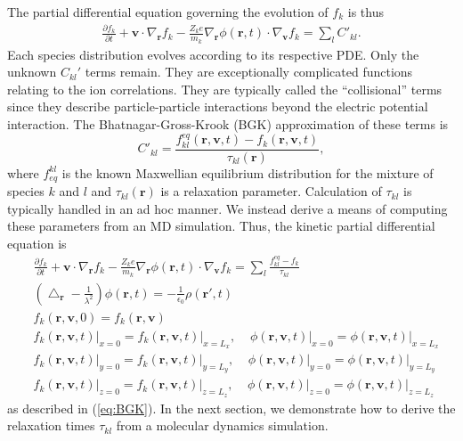 \documentclass{article}
\begin{document}
The partial differential equation governing the evolution of $f_k$ is thus
\begin{align*}
\frac{\partial f_k}{\partial t}+\mathbf{v}\cdot\nabla_\mathbf{r}f_k-\frac{Z_ke}{m_k}\nabla_\mathbf{r}\phi(\mathbf{r},t)\cdot\nabla_\mathbf{v}f_k=\sum_l C'_{kl}.
\end{align*}
Each species distribution evolves according to its respective PDE. Only the unknown $C_{kl}'$ terms remain. They are exceptionally complicated functions relating to the ion correlations. They are typically called the ``collisional'' terms since they describe particle-particle interactions beyond the electric potential interaction. The Bhatnagar-Gross-Krook (BGK) approximation of these terms is 
\[C'_{kl}=\frac{f_{kl}^{eq}(\mathbf{r},\mathbf{v},t)-f_k(\mathbf{r},\mathbf{v},t)}{\tau_{kl}(\mathbf{r})},
\]
where $f_{eq}^{kl}$ is the known Maxwellian equilibrium distribution for the mixture of species $k$ and $l$ and $\tau_{kl}(\mathbf{r})$ is a relaxation parameter. Calculation of $\tau_{kl}$ is  typically handled in an ad hoc manner. We instead derive a means of computing these parameters from an MD simulation. Thus, the kinetic partial differential equation is
\begin{equation*}
\begin{split}
&\frac{\partial f_k}{\partial t}+\mathbf{v}\cdot\nabla_\mathbf{r}f_k-\frac{Z_ke}{m_k}\nabla_\mathbf{r}\phi(\mathbf{r},t)\cdot\nabla_\mathbf{v}f_k=\sum_l\frac{f_{kl}^{eq}-f_k}{\tau_{kl}}\\
&\left(\bigtriangleup_\mathbf{r}-\frac{1}{\lambda^2}\right)\phi(\mathbf{r},t)=-\frac{1}{\epsilon_0}\rho(\mathbf{r}',t)\\
&f_k(\mathbf{r},\mathbf{v},0)=f_{k}(\mathbf{r},\mathbf{v})\\
&\left.f_k(\mathbf{r},\mathbf{v},t)\right|_{x=0}=\left.f_{k}(\mathbf{r},\mathbf{v},t)\right|_{x=L_x},\;\;\;\;
\left.\phi(\mathbf{r},\mathbf{v},t)\right|_{x=0}=\left.\phi(\mathbf{r},\mathbf{v},t)\right|_{x=L_x}\\
&\left.f_k(\mathbf{r},\mathbf{v},t)\right|_{y=0}=\left.f_{k}(\mathbf{r},\mathbf{v},t)\right|_{y=L_y},\;\;\;\;
\left.\phi(\mathbf{r},\mathbf{v},t)\right|_{y=0}=\left.\phi(\mathbf{r},\mathbf{v},t)\right|_{y=L_y}\\
&\left.f_k(\mathbf{r},\mathbf{v},t)\right|_{z=0}=\left.f_{k}(\mathbf{r},\mathbf{v},t)\right|_{z=L_z},\;\;\;\;
\left.\phi(\mathbf{r},\mathbf{v},t)\right|_{z=0}=\left.\phi(\mathbf{r},\mathbf{v},t)\right|_{z=L_z}
\end{split}
\end{equation*}as described in (\ref{eq:BGK}). In the next section, we demonstrate how to derive the relaxation times $\tau_{kl}$ from a molecular dynamics simulation.
\end{document}

